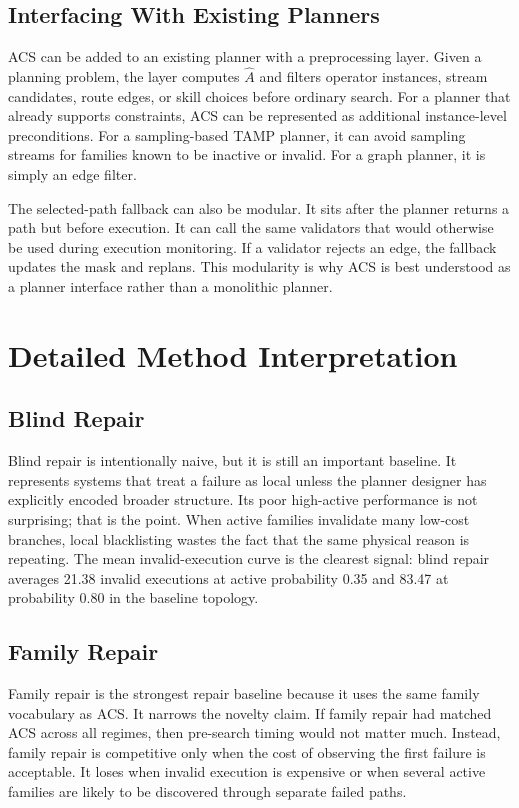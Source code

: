 \documentclass{article}
\newcommand{\ACS}{\textsc{ACS}}
\newcommand{\Ahat}{\hat{A}}
\begin{document}
\subsection{Interfacing With Existing Planners}

\ACS{} can be added to an existing planner with a preprocessing layer. Given a planning problem, the layer computes $\Ahat$ and filters operator instances, stream candidates, route edges, or skill choices before ordinary search. For a planner that already supports constraints, \ACS{} can be represented as additional instance-level preconditions. For a sampling-based TAMP planner, it can avoid sampling streams for families known to be inactive or invalid. For a graph planner, it is simply an edge filter.

The selected-path fallback can also be modular. It sits after the planner returns a path but before execution. It can call the same validators that would otherwise be used during execution monitoring. If a validator rejects an edge, the fallback updates the mask and replans. This modularity is why \ACS{} is best understood as a planner interface rather than a monolithic planner.

\section{Detailed Method Interpretation}

\subsection{Blind Repair}

Blind repair is intentionally naive, but it is still an important baseline. It represents systems that treat a failure as local unless the planner designer has explicitly encoded broader structure. Its poor high-active performance is not surprising; that is the point. When active families invalidate many low-cost branches, local blacklisting wastes the fact that the same physical reason is repeating. The mean invalid-execution curve is the clearest signal: blind repair averages 21.38 invalid executions at active probability 0.35 and 83.47 at probability 0.80 in the baseline topology.

\subsection{Family Repair}

Family repair is the strongest repair baseline because it uses the same family vocabulary as \ACS{}. It narrows the novelty claim. If family repair had matched \ACS{} across all regimes, then pre-search timing would not matter much. Instead, family repair is competitive only when the cost of observing the first failure is acceptable. It loses when invalid execution is expensive or when several active families are likely to be discovered through separate failed paths.
\end{document}
